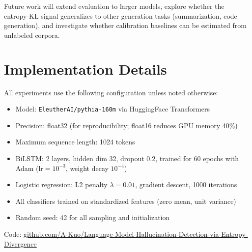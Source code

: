 \documentclass[11pt]{article}
\begin{document}
Future work will extend evaluation to larger models, explore whether the 
entropy-KL signal generalizes to other generation tasks (summarization, 
code generation), and investigate whether calibration baselines can be 
estimated from unlabeled corpora.




\appendix

\section{Implementation Details}
\label{app:implementation}

All experiments use the following configuration unless noted otherwise:

\begin{itemize}
  \item Model: \texttt{EleutherAI/pythia-160m} via HuggingFace Transformers
  \item Precision: float32 (for reproducibility; float16 reduces GPU memory 40\%)
  \item Maximum sequence length: 1024 tokens
  \item BiLSTM: 2 layers, hidden dim 32, dropout 0.2, trained for 60 epochs 
    with Adam ($\text{lr}=10^{-3}$, weight decay $10^{-4}$)
  \item Logistic regression: L2 penalty $\lambda=0.01$, gradient descent, 
    1000 iterations
  \item All classifiers trained on standardized features (zero mean, unit variance)
  \item Random seed: 42 for all sampling and initialization
\end{itemize}

Code: \href{https://github.com/A-Kuo/Language-Model-Hallucination-Detection-via-Entropy-Divergence}{github.com/A-Kuo/Language-Model-Hallucination-Detection-via-Entropy-Divergence}
\end{document}
